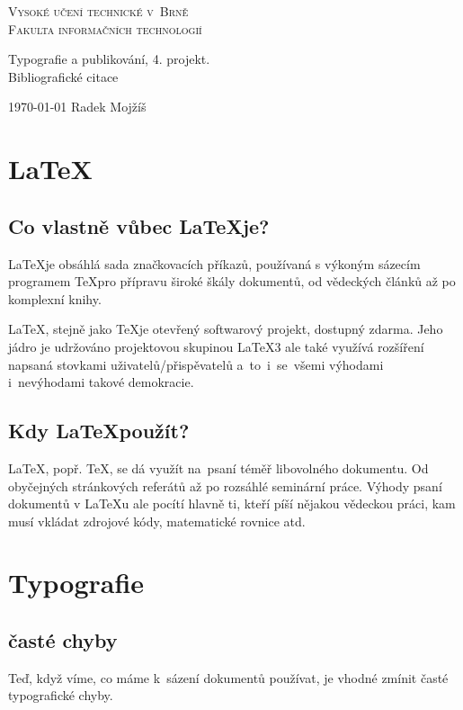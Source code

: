 \documentclass[11pt,a4paper,titlepage]{article}
\begin{document}
\thispagestyle{empty}
\begin{center}

\textsc{
\Huge{Vysoké učení technické v~Brně \\}
\huge{Fakulta informačních technologií\\}
}
 

\LARGE{Typografie a publikování, 4. projekt. \\}
\Huge{Bibliografické citace\\}

\end{center}

\Large{\today} \hfill Radek Mojžíš

\newpage
\setcounter{page}{1}
\newpage
\section{\LaTeX}
\subsection{Co vlastně vůbec \LaTeX je?}
\LaTeX je obsáhlá sada značkovacích příkazů, používaná s výkoným
sázecím programem \TeX pro přípravu široké škály dokumentů,
od vědeckých článků až po komplexní knihy.

\LaTeX, stejně jako \TeX je otevřený softwarový projekt, dostupný zdarma.
Jeho jádro je udržováno projektovou skupinou \LaTeX3 ale také využívá rozšíření 
napsaná stovkami uživatelů/přispěvatelů a~to~i~se~všemi výhodami i~nevýhodami
takové demokracie.
\cite{book:guide-to-latex}

\subsection{Kdy \LaTeX použít?}
LaTeX, popř. TeX, se dá využít na~psaní téměř libovolného dokumentu.
Od obyčejných stránkových referátů až po rozsáhlé seminární práce. 
Výhody psaní dokumentů v LaTeXu ale pocítí hlavně ti, kteří píší
nějakou vědeckou práci, kam musí vkládat zdrojové kódy, matematické
rovnice atd.
\cite{web:kdy-pouzit-latex}

\section{Typografie}
\subsection{časté chyby}
Teď, když víme, co máme k~sázení dokumentů používat, je vhodné zmínit
časté typografické chyby.
\end{document}
